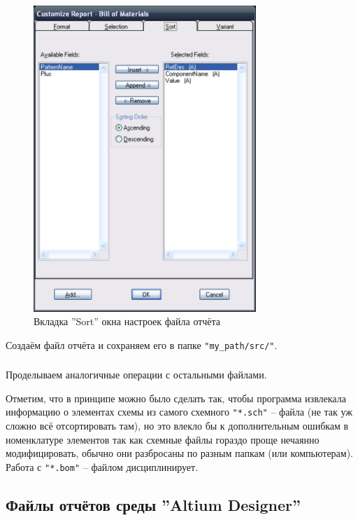 \newpage
\begin{figure}[H]\center
  \includegraphics[width=0.75\textwidth]{VP_auto/pictures/pcad/pic_pcad_customize_report_sort}
  \caption{Вкладка ''Sort'' окна настроек файла отчёта} \label{p:pic_pcad_customize_report_sort}
\end{figure}

Создаём файл отчёта и сохраняем его в папке \verb|"my_path/src/"|.

\subsubsection{}Проделываем аналогичные операции с остальными файлами.

Отметим, что в принципе можно было сделать так, чтобы программа извлекала информацию о элементах схемы из самого схемного \verb|"*.sch"| -- файла (не так уж сложно всё отсортировать там), но это влекло бы к дополнительным ошибкам в номенклатуре элементов так как схемные файлы гораздо проще нечаянно модифицировать, обычно они разбросаны по разным папкам (или компьютерам). Работа с \verb|"*.bom"| -- файлом дисциплинирует. 



\newpage
\subsection{Файлы отчётов среды ''Altium Designer''}

